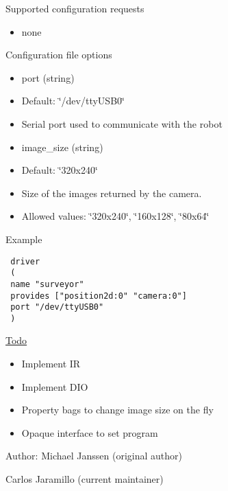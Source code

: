 \begin{Desc}
\item[Supported configuration requests]\end{Desc}
\begin{itemize}
\item none\end{itemize}


\begin{Desc}
\item[Configuration file options]\end{Desc}
\begin{itemize}
\item port (string)\item Default: \char`\"{}/dev/ttyUSB0\char`\"{}\item Serial port used to communicate with the robot\item image\_\-size (string)\item Default: \char`\"{}320x240\char`\"{}\item Size of the images returned by the camera.\item Allowed values: \char`\"{}320x240\char`\"{}, \char`\"{}160x128\char`\"{}, \char`\"{}80x64\char`\"{}\end{itemize}


\begin{Desc}
\item[Example]\end{Desc}


\footnotesize\begin{verbatim}
 driver
 (
 name "surveyor"
 provides ["position2d:0" "camera:0"]
 port "/dev/ttyUSB0"
 )
 \end{verbatim}
\normalsize


\begin{Desc}
\item[\hyperlink{todo__todo000001}{Todo}]\begin{itemize}
\item Implement IR\item Implement DIO\item Property bags to change image size on the fly\item Opaque interface to set program\end{itemize}
\end{Desc}
\begin{Desc}
\item[Author:]Michael Janssen (original author) 

Carlos Jaramillo (current maintainer) \end{Desc}


